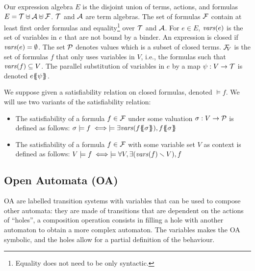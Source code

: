 \documentclass[runningheads]{llncs}
\begin{document}
Our expression algebra \(E\) is the disjoint union  of  terms,  actions, and  formulas
\( E=\terms \uplus \actions \uplus \formulas\).
\(\terms\) and \(\actions\) are term algebras.
The set of formulas \(\formulas\) contain at least first order formulas and equality\footnote{Equality does not need to be only syntactic.} over \(\terms\) and \(\actions\). 
For \(e \in E\),
 \(\fvars{e}\) is the set of variables in  $e$ that are not bound by a binder. 
An expression is closed if \(\fvars{e}=\emptyset\).
The set \(\values\) denotes values which is a subset of closed terms. \(\rformulas[V]\) is the set of formulas $f$ that only uses variables in $V$, i.e., the formulas such that  \(\fvars{f}\subseteq V\).
The parallel substitution of variables in \(e\) by a map \(\psi: V \to \terms\) is denoted \(e\psubst{\psi}\).


 We suppose given a satisfiability relation on closed formulas, denoted \({\models} f\).
We will use two variants of the satisfiability relation:
\begin{itemize}
\item The satisfiability of a formula \(f \in \formulas\) under some valuation \(\sigma: V \to \values\) is defined as follows:
\( \sigma \models f \iff \models \exists \fvars{f\psubst{\sigma}}, f\psubst{\sigma} \)
\item The satisfiability of a formula \(f \in \formulas\) with some variable set \(V\) as context is defined as follows:
\( V \models f \iff  \models \forall V, \exists\mpar{\fvars{f} \setminus V}, f \)
\end{itemize}


\subsection{Open Automata (OA)}\label{sec:def}
 OA  are labelled transition systems with variables  that can be used to compose other automata: they are made of transitions that are dependent on the actions of ``holes'', a composition operation consists in filling a hole with another automaton to obtain a more complex automaton. The variables makes the OA symbolic, and the holes allow for a partial definition of the behaviour.
\end{document}
